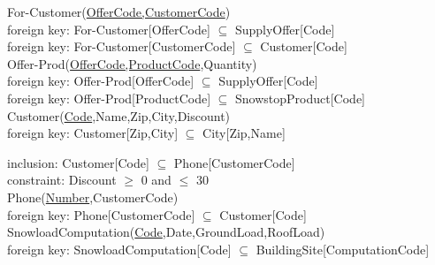\documentclass{article}[h]
\begin{document}
{{{\color{ForestGreen}For-Customer(\underline{OfferCode,CustomerCode})}\\
{\color{Orange}\hspace{2mm} foreign key: {\color{Magenta}For-Customer[OfferCode] $\subseteq$ SupplyOffer[Code]}} \\
{\color{Orange}\hspace{2mm} foreign key: {\color{Magenta}For-Customer[CustomerCode] $\subseteq$ Customer[Code]}} \\

{\color{ForestGreen}Offer-Prod(\underline{OfferCode,ProductCode},Quantity)}\\
{\color{Orange}\hspace{2mm} foreign key: {\color{Magenta}Offer-Prod[OfferCode] $\subseteq$ SupplyOffer[Code]}} \\
{\color{Orange}\hspace{2mm} foreign key: {\color{Magenta}Offer-Prod[ProductCode] $\subseteq$ SnowstopProduct[Code]}} \\

{\color{ForestGreen}Customer(\underline{Code},Name,Zip,City,Discount)}\\
{\color{Orange}\hspace{2mm} foreign key: {\color{Magenta}Customer[Zip,City] $\subseteq$ City[Zip,Name]}} \\
{\color{Orange}\hspace{2mm} inclusion: {\color{Magenta}Customer[Code] $\subseteq$ Phone[CustomerCode]} \\
{\color{Orange}\hspace{2mm} constraint: {\color{Magenta}Discount $\geqslant$  0 and $\leqslant$ 30}} \\ 

{\color{ForestGreen}Phone(\underline{Number},CustomerCode)}\\
{\color{Orange}\hspace{2mm} foreign key: {\color{Magenta}Phone[CustomerCode] $\subseteq$ Customer[Code]}} \\

{\color{ForestGreen}SnowloadComputation(\underline{Code},Date,GroundLoad,RoofLoad)}\\
{\color{Orange}\hspace{2mm} foreign key: {\color{Magenta}SnowloadComputation[Code] $\subseteq$ BuildingSite[ComputationCode]}} \\

\pagebreak

}}}
\end{document}
